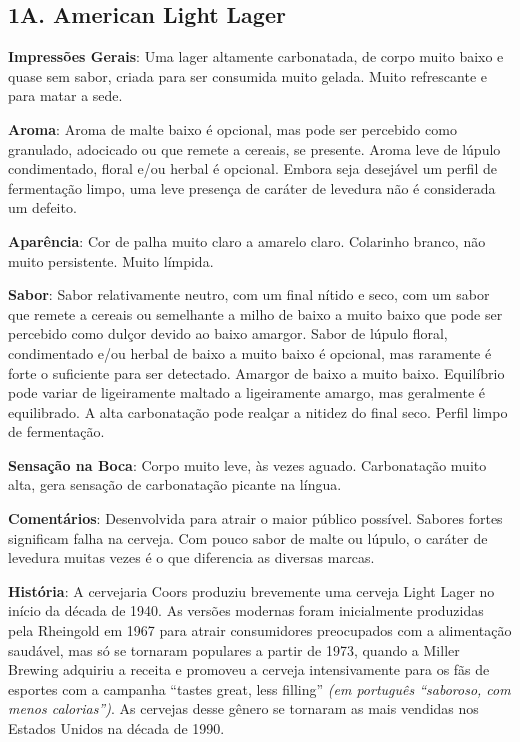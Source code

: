 \subsection*{1A. American Light Lager}
\textbf{Impressões Gerais}: Uma lager altamente carbonatada, de corpo muito baixo e quase sem sabor, criada para ser consumida muito gelada. Muito refrescante e para matar a sede.

\textbf{Aroma}: Aroma de malte baixo é opcional, mas pode ser percebido como granulado, adocicado ou que remete a cereais, se presente. Aroma leve de lúpulo condimentado, floral e/ou herbal é opcional. Embora seja desejável um perfil de fermentação limpo, uma leve presença de caráter de levedura não é considerada um defeito.

\textbf{Aparência}: Cor de palha muito claro a amarelo claro. Colarinho branco, não muito persistente. Muito límpida.

\textbf{Sabor}: Sabor relativamente neutro, com um final nítido e seco, com um sabor que remete a cereais ou semelhante a milho de baixo a muito baixo que pode ser percebido como dulçor devido ao baixo amargor. Sabor de lúpulo floral, condimentado e/ou herbal de baixo a muito baixo é opcional, mas raramente é forte o suficiente para ser detectado. Amargor de baixo a muito baixo. Equilíbrio pode variar de ligeiramente maltado a ligeiramente amargo, mas geralmente é equilibrado. A alta carbonatação pode realçar a nitidez do final seco. Perfil limpo de fermentação.

\textbf{Sensação na Boca}: Corpo muito leve, às vezes aguado. Carbonatação muito alta, gera sensação de carbonatação picante na língua.

\textbf{Comentários}: Desenvolvida para atrair o maior público possível. Sabores fortes significam falha na cerveja. Com pouco sabor de malte ou lúpulo, o caráter de levedura muitas vezes é o que diferencia as diversas marcas.

\textbf{História}: A cervejaria Coors produziu brevemente uma cerveja Light Lager no início da década de 1940. As versões modernas foram inicialmente produzidas pela Rheingold em 1967 para atrair consumidores preocupados com a alimentação saudável, mas só se tornaram populares a partir de 1973, quando a Miller Brewing adquiriu a receita e promoveu a cerveja intensivamente para os fãs de esportes com a campanha “tastes great, less filling” \textit{(em português “saboroso, com menos calorias”)}. As cervejas desse gênero se tornaram as mais vendidas nos Estados Unidos na década de 1990.

